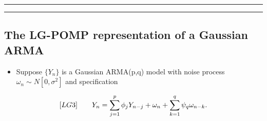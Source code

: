 \documentclass[]{article}
\providecommand{\tightlist}{%
  \setlength{\itemsep}{0pt}\setlength{\parskip}{0pt}}
\begin{document}
\begin{center}\rule{0.5\linewidth}{\linethickness}\end{center}

\begin{center}\rule{0.5\linewidth}{\linethickness}\end{center}

\subsection{The LG-POMP representation of a Gaussian
ARMA}\label{the-lg-pomp-representation-of-a-gaussian-arma}

\begin{itemize}
\tightlist
\item
  Suppose \(\{Y_n\}\) is a Gaussian ARMA(p,q) model with noise process
  \(\omega_n\sim N[0,\sigma^2]\) and specification
\end{itemize}

$$[LG3]
\quad\quad\displaystyle Y_n = \sum_{j=1}^p \phi_j Y_{n-j} + \omega_n + \sum_{k=1}^q \psi_q \omega_{n-k}.$$
\end{document}
